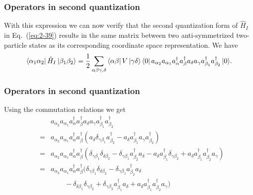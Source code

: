 \frame
{
  \frametitle{Operators in second quantization}
\begin{small}
{\scriptsize
With this expression we can now verify that the second quantization form of $\hat{H}_I$ in Eq.~(\ref{eq:2-39}) 
results in the same matrix between two anti-symmetrized two-particle states as its corresponding coordinate
space representation. We have  
\begin{equation}
	\element{\alpha_1 \alpha_2}{\hat{H}_I}{\beta_1 \beta_2} =
		\frac{1}{2} \sum_{\alpha\beta\gamma, \delta}
			\element{\alpha\beta}{V}{\gamma\delta} \element{0}{a_{\alpha_2} a_{\alpha_1} 
			 a^\dagger_\alpha a^\dagger_\beta a_\delta a_\gamma 
			 a_{\beta_1}^\dagger a_{\beta_2}^\dagger}{0}. \label{eq:2-40}
\end{equation}
}
\end{small}
}


\frame
{
  \frametitle{Operators in second quantization}
\begin{small}
{\scriptsize
Using the commutation relations we get 
\begin{eqnarray}
	&& a_{\alpha_2} a_{\alpha_1}a^\dagger_\alpha a^\dagger_\beta 
		a_\delta a_\gamma a_{\beta_1}^\dagger a_{\beta_2}^\dagger \nonumber \\
	&=& a_{\alpha_2} a_{\alpha_1}a^\dagger_\alpha a^\dagger_\beta 
		( a_\delta \delta_{\gamma \beta_1} a_{\beta_2}^\dagger - 
		a_\delta  a_{\beta_1}^\dagger a_\gamma a_{\beta_2}^\dagger ) \nonumber \\
	&=& a_{\alpha_2} a_{\alpha_1}a^\dagger_\alpha a^\dagger_\beta 
		(\delta_{\gamma \beta_1} \delta_{\delta \beta_2} - \delta_{\gamma \beta_1} a_{\beta_2}^\dagger a_\delta -
		a_\delta a_{\beta_1}^\dagger\delta_{\gamma \beta_2} +
		a_\delta a_{\beta_1}^\dagger a_{\beta_2}^\dagger a_\gamma ) \nonumber \\
	&=& a_{\alpha_2} a_{\alpha_1}a^\dagger_\alpha a^\dagger_\beta 
		(\delta_{\gamma \beta_1} \delta_{\delta \beta_2} - \delta_{\gamma \beta_1} a_{\beta_2}^\dagger a_\delta \nonumber \\
		&& \qquad - \delta_{\delta \beta_1} \delta_{\gamma \beta_2} + \delta_{\gamma \beta_2} a_{\beta_1}^\dagger a_\delta
		+ a_\delta a_{\beta_1}^\dagger a_{\beta_2}^\dagger a_\gamma ) \label{eq:2-41}
\end{eqnarray}
}
\end{small}
}


